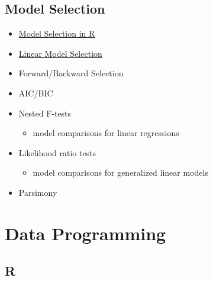 \documentclass[]{book}
\providecommand{\tightlist}{%
  \setlength{\itemsep}{0pt}\setlength{\parskip}{0pt}}
\begin{document}
\hypertarget{model-selection}{%
\section{Model Selection}\label{model-selection}}

\begin{itemize}
\item
  \href{http://r-statistics.co/Model-Selection-in-R.html}{Model Selection in R}
\item
  \href{https://uc-r.github.io/model_selection}{Linear Model Selection}
\item
  Forward/Backward Selection
\item
  AIC/BIC
\item
  Nested F-tests

  \begin{itemize}
  \tightlist
  \item
    model comparisons for linear regressions
  \end{itemize}
\item
  Likelihood ratio tests

  \begin{itemize}
  \tightlist
  \item
    model comparisons for generalized linear models
  \end{itemize}
\item
  Parsimony
\end{itemize}

\hypertarget{data-programming}{%
\chapter*{Data Programming}\label{data-programming}}

\hypertarget{r}{%
\section{R}\label{r}}
\end{document}

